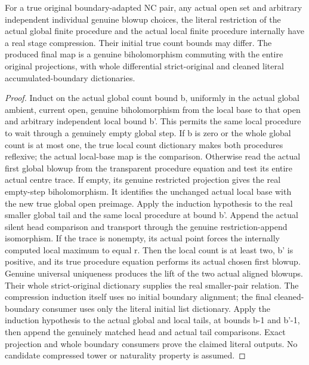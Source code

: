 \begin{theorem}
\label{hir:general-nc-open-actual-procedure-comparison}
\leanok
For a true original boundary-adapted NC pair, any actual open set and arbitrary
independent individual genuine blowup choices, the literal restriction of the
actual global finite procedure and the actual local finite procedure internally
have a real stage compression. Their initial true count bounds may differ.
The produced final map is a genuine biholomorphism commuting with the entire
original projections, with whole differential strict-original and cleaned
literal accumulated-boundary dictionaries.
\end{theorem}
\begin{proof}
Induct on the actual global count bound b, uniformly in the actual global
ambient, current open, genuine biholomorphism from the local base to that open
and arbitrary independent local bound b'. This permits the same local
procedure to wait through a genuinely empty global step. If b is zero or the
whole global count is at most one, the true local count dictionary makes both
procedures reflexive; the actual local-base map is the comparison.
Otherwise read the actual first global blowup from the transparent procedure
equation and test its entire actual centre trace. If empty, its genuine
restricted projection gives the real empty-step biholomorphism. It identifies
the unchanged actual local base with the new true global open preimage. Apply
the induction hypothesis to the real smaller global tail and the same local
procedure at bound b'. Append the actual silent head comparison and transport
through the genuine restriction-append isomorphism.
If the trace is nonempty, its actual point forces the internally computed local
maximum to equal r. Then the local count is at least two, b' is positive, and
its true procedure equation performs its actual chosen first blowup. Genuine
universal uniqueness produces the lift of the two actual aligned blowups.
Their whole strict-original dictionary supplies the real smaller-pair relation.
The compression induction itself uses no initial boundary alignment; the
final cleaned-boundary consumer uses only the literal initial list dictionary. Apply the induction hypothesis to the actual global
and local tails, at bounds b-1 and b'-1, then append the genuinely matched head
and actual tail comparisons. Exact projection and whole boundary consumers
prove the claimed literal outputs. No candidate compressed tower or naturality
property is assumed.
\end{proof}

